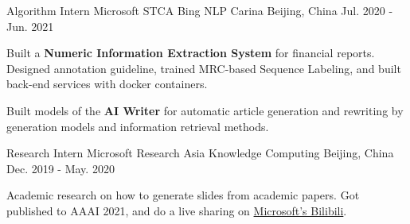 \begin{cventries}
  \cventry
    {Algorithm Intern} %
    {Microsoft STCA Bing NLP Carina} %
    {Beijing, China} %
    {Jul. 2020 - Jun. 2021} %
    {
      \begin{cvitems} %
        \item {Built a \textbf{Numeric Information Extraction System} for financial reports. Designed annotation guideline, trained MRC-based Sequence Labeling, and built back-end services with docker containers.}
        \item {Built models of the \textbf{AI Writer} for automatic article generation and rewriting by generation models and information retrieval methods.}
      \end{cvitems}
    }

  \cventry
    {Research Intern} %
    {Microsoft Research Asia Knowledge Computing} %
    {Beijing, China} %
    {Dec. 2019 - May. 2020} %
    {
      \begin{cvitems} %
        \item {Academic research on how to generate slides from academic papers. Got published to AAAI 2021, and do a live sharing on \href{https://www.bilibili.com/video/BV1fV411q7Ho/}{Microsoft's Bilibili}.}
      \end{cvitems}
    }

\end{cventries}
